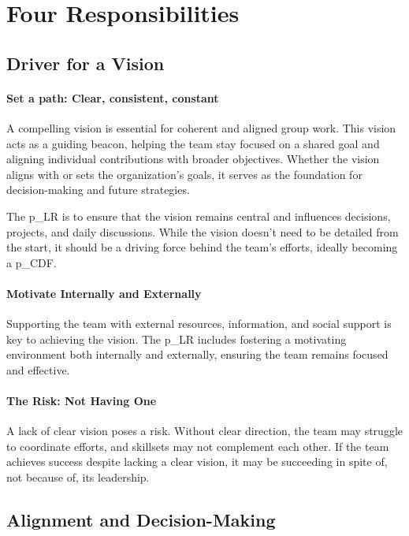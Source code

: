 \section{Four Responsibilities}

\subsection{Driver for a Vision}\label{responsibility__driver}
\paragraph{Set a path: Clear, consistent, constant}

A compelling vision is essential for coherent and aligned group work. This vision acts as a guiding beacon, helping the team stay focused on a shared goal and aligning individual contributions with broader objectives. Whether the vision aligns with or sets the organization's goals, it serves as the foundation for decision-making and future strategies.

The \gls{p_LR} is to ensure that the vision remains central and influences decisions, projects, and daily discussions. While the vision doesn’t need to be detailed from the start, it should be a driving force behind the team's efforts, ideally becoming a \gls{p_CDF}.

\paragraph{Motivate Internally and Externally}
Supporting the team with external resources, information, and social support is key to achieving the vision. The \gls{p_LR} includes fostering a motivating environment both internally and externally, ensuring the team remains focused and effective.

\paragraph{The Risk: Not Having One}
A lack of clear vision poses a risk. Without clear direction, the team may struggle to coordinate efforts, and skillsets may not complement each other. If the team achieves success despite lacking a clear vision, it may be succeeding in spite of, not because of, its leadership.

\subsection{Alignment and Decision-Making} \label{responsibility__alignment}
